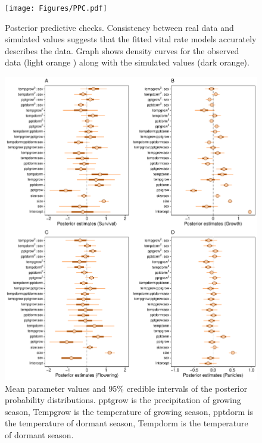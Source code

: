 \documentclass[12pt]{article}\usepackage[]{graphicx}\usepackage[dvipsnames]{xcolor}
\begin{document}
\begin{figure}[H]
	\centering
	\texttt{[image: Figures/PPC.pdf]}
	\caption{Posterior predictive checks. Consistency between real data and simulated values suggests that the fitted vital rate models accurately describes the data. Graph shows density curves for the observed data (light orange ) along with the simulated values (dark orange).}
	\label{Sup:PPC}
\end{figure}

\begin{figure}[H]
	\centering
	\includegraphics[width=0.99\linewidth]{Figures/Posterior_mean.pdf}
	\caption{Mean parameter values and 95\% credible intervals of the posterior probability distributions. 
		pptgrow is  the precipitation of growing season,
		Tempgrow is the temperature of growing season,
		pptdorm is the temperature of dormant season,
		Tempdorm is the temperature of dormant season.}
	\label{Sup:Posterior}
\end{figure}
\end{document}
